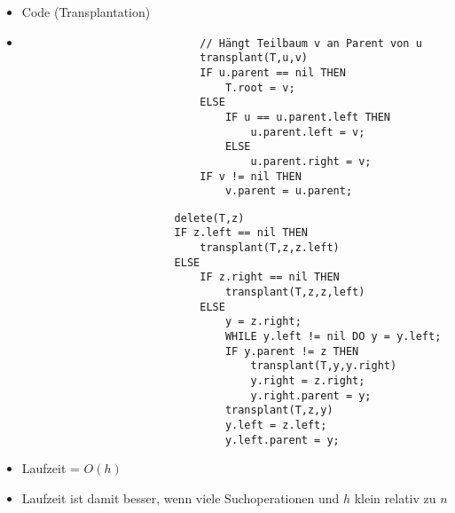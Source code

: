 \begin{itemize}
\begin{itemize}
                \item Code (Transplantation)
                \item[]
                    \begin{minipage}{0.45\textwidth}
                            \begin{verbatim}
                            // Hängt Teilbaum v an Parent von u
                            transplant(T,u,v) 
                            IF u.parent == nil THEN
                                T.root = v;
                            ELSE
                                IF u == u.parent.left THEN
                                    u.parent.left = v;
                                ELSE 
                                    u.parent.right = v;
                            IF v != nil THEN
                                v.parent = u.parent;
                            \end{verbatim}
                    \end{minipage}
                    \begin{minipage}{0.45\textwidth}
                        \begin{verbatim}
                        delete(T,z)
                        IF z.left == nil THEN
                            transplant(T,z,z.left)
                        ELSE
                            IF z.right == nil THEN
                                transplant(T,z,z,left)
                            ELSE
                                y = z.right;
                                WHILE y.left != nil DO y = y.left;
                                IF y.parent != z THEN
                                    transplant(T,y,y.right)
                                    y.right = z.right;
                                    y.right.parent = y;
                                transplant(T,z,y)
                                y.left = z.left;
                                y.left.parent = y;
                        \end{verbatim}
                    \end{minipage}
                \item Laufzeit = $O(h)$
                \item Laufzeit ist damit besser, wenn viele Suchoperationen und $h$ klein relativ zu $n$
            \end{itemize}


\end{itemize}
